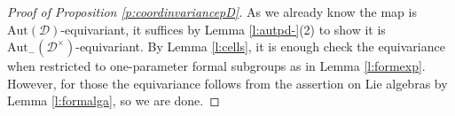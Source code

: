 \documentclass{amsart}
\newtheorem{Lem}[Thm]{Lemma}
\theoremstyle{definition}
\newcommand{\Pro}{\on{Pro}}
\newcommand{\D}{\sD}
\newcommand{\sD}{\mathscr{D}}
\newcommand{\Sing}{\mathsf{S}}
\renewcommand{\mod}{\text{-}\on{Mod}}
\newcommand{\on}{\mathrm}
\newcommand{\Am}{\Aut_-(\pD)}
\newcommand{\pD}{\sD^\times}
\newcommand{\bk}{\mathbf{k}}
\newcommand{\Aut}{\on{Aut}}
\numberwithin{equation}{section}
\begin{document}
\begin{proof}[Proof of Proposition \ref{p:coordinvariancepD}]
As we already know the map is $\Aut(\D)$-equivariant, it suffices by Lemma \ref{l:autpd-}(2) to show it is $\Am$-equivariant. By Lemma \ref{l:cells}, it is enough check the equivariance when restricted to one-parameter formal subgroups as in Lemma \ref{l:formexp}. However, for those the equivariance follows from the assertion on Lie algebras by Lemma \ref{l:formalga}, so we are done.  

\end{proof}
\end{document}
